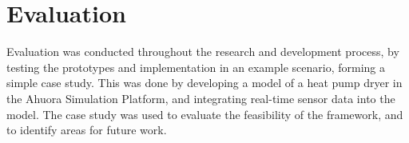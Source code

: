 \section{Evaluation}

Evaluation was conducted throughout the research and development process, by testing the prototypes and implementation in an example scenario, forming a simple case study. This was done by developing a model of a heat pump dryer in the Ahuora Simulation Platform, and integrating real-time sensor data into the model. The case study was used to evaluate the feasibility of the framework, and to identify areas for future work.

